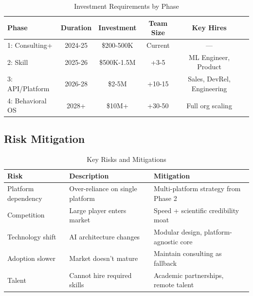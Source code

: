 \begin{table}[htbp]
\centering
\caption{Investment Requirements by Phase}
\label{tab:vvv-investment}
\renewcommand{\arraystretch}{1.3}
\begin{tabular}{@{}lccccc@{}}
\toprule
\textbf{Phase} & \textbf{Duration} & \textbf{Investment} & \textbf{Team Size} & \textbf{Key Hires} \\
\midrule
1: Consulting+ & 2024-25 & \$200-500K & Current & --- \\
2: Skill & 2025-26 & \$500K-1.5M & +3-5 & ML Engineer, Product \\
3: API/Platform & 2026-28 & \$2-5M & +10-15 & Sales, DevRel, Engineering \\
4: Behavioral OS & 2028+ & \$10M+ & +30-50 & Full org scaling \\
\bottomrule
\end{tabular}
\end{table}


\subsection{Risk Mitigation}

\begin{table}[htbp]
\centering
\caption{Key Risks and Mitigations}
\label{tab:vvv-risks}
\renewcommand{\arraystretch}{1.3}
\begin{tabular}{@{}lp{4cm}p{4cm}@{}}
\toprule
\textbf{Risk} & \textbf{Description} & \textbf{Mitigation} \\
\midrule
Platform dependency & Over-reliance on single platform & Multi-platform strategy from Phase 2 \\
Competition & Large player enters market & Speed + scientific credibility moat \\
Technology shift & AI architecture changes & Modular design, platform-agnostic core \\
Adoption slower & Market doesn't mature & Maintain consulting as fallback \\
Talent & Cannot hire required skills & Academic partnerships, remote talent \\
\bottomrule
\end{tabular}
\end{table}


